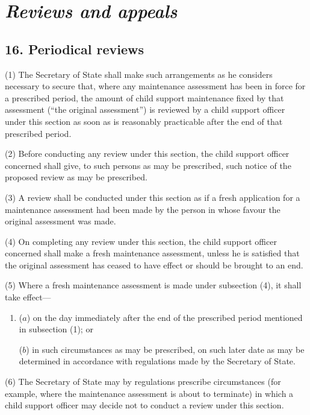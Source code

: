 \documentclass[12pt,a4paper]{article}
\begin{document}

\section{\itshape Reviews and appeals}

\subsection{16. Periodical reviews}

(1) The Secretary of State shall make such arrangements as he considers necessary to secure that, where any maintenance assessment has been in force for a prescribed period, the amount of child support maintenance fixed by that assessment (“the original assessment”) is reviewed by a child support officer under this section as soon as is reasonably practicable after the end of that prescribed period.

(2) Before conducting any review under this section, the child support officer concerned shall give, to such persons as may be prescribed, such notice of the proposed review as may be prescribed.

(3) A review shall be conducted under this section as if a fresh application for a maintenance assessment had been made by the person in whose favour the original assessment was made.

(4) On completing any review under this section, the child support officer concerned shall make a fresh maintenance assessment, unless he is satisfied that the original assessment has ceased to have effect or should be brought to an end.

(5) Where a fresh maintenance assessment is made under subsection (4), it shall take effect—
\begin{enumerate}\item[]
($a$) on the day immediately after the end of the prescribed period mentioned in subsection (1); or

($b$) in such circumstances as may be prescribed, on such later date as may be determined in accordance with regulations made by the Secretary of State.
\end{enumerate}

(6) The Secretary of State may by regulations prescribe circumstances (for example, where the maintenance assessment is about to terminate) in which a child support officer may decide not to conduct a review under this section.
\end{document}
